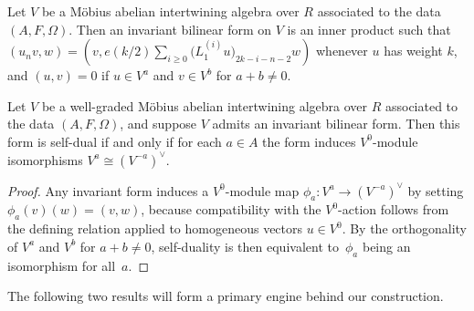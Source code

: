 \begin{defn}Let $V$ be a M\"obius abelian intertwining algebra over $R$ associated to the data $(A,F,\Omega)$. Then an invariant bilinear form on $V$ is an inner product such that $(u_n v,w) = (v, e(k/2) \sum\limits_{i \geq 0} \big(L_1^{(i)} u\big)_{2k-i-n-2}w)$ whenever $u$ has weight $k$, and $(u,v) = 0$ if $u \in V^a$ and $v \in V^b$ for $a+b \neq 0$.
\end{defn}

\begin{lem}Let $V$ be a well-graded M\"obius abelian intertwining algebra over $R$ associated to the data $(A,F,\Omega)$, and suppose $V$ admits an invariant bilinear form. Then this form is self-dual if and only if for each $a \in A$ the form induces $V^0$-module isomorphisms $V^a \cong (V^{-a})^\vee$.
\end{lem}
\begin{proof}Any invariant form induces a $V^0$-module map $\phi_a\colon V^a \to (V^{-a})^\vee$ by setting $\phi_a(v)(w) = (v,w)$, because compatibility with the $V^0$-action follows from the defining relation applied to homogeneous vectors $u \in V^0$. By the orthogonality of $V^a$ and $V^b$ for $a+b \neq 0$, self-duality is then equivalent to~$\phi_a$ being an isomorphism for all~$a$.
\end{proof}

The following two results will form a primary engine behind our construction.

